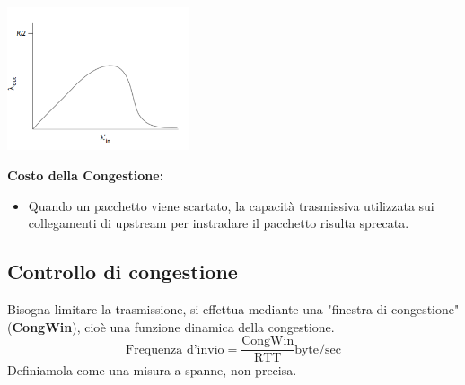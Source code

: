 \begin{center}
  \includegraphics[width=0.4\textwidth]{img/scenario3diag.png}
\end{center}

\textbf{Costo della Congestione:}
\begin{itemize}
    \item Quando un pacchetto viene scartato, la capacità trasmissiva utilizzata sui collegamenti di upstream per instradare il pacchetto risulta sprecata.
\end{itemize}

\subsection{Controllo di congestione}
Bisogna limitare la trasmissione, si effettua mediante una "finestra di congestione" (\textbf{CongWin}), cioè una funzione dinamica della congestione.
\[\text{Frequenza d'invio} = \frac{\text{CongWin}}{\text{RTT}} \text{byte/sec}\]
Definiamola come una misura a spanne, non precisa.

